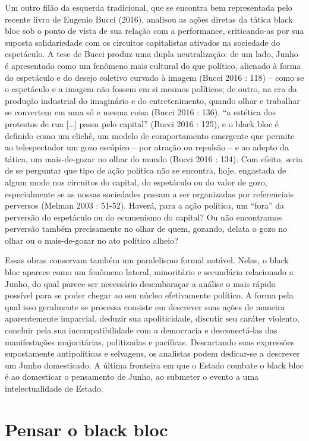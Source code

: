 Um outro filão da esquerda tradicional, que se encontra bem representada
pelo recente livro de Eugenio Bucci (2016), analisou as ações diretas da
tática black bloc sob o ponto de vista de sua relação com a performance,
criticando-as por sua suposta solidariedade com os circuitos
capitalistas ativados na sociedade do espetáculo. A tese de Bucci produz
uma dupla neutralização: de um lado, Junho é apresentado como um
fenômeno mais cultural do que político, alienado à forma do espetáculo e
do desejo coletivo curvado à imagem (Bucci 2016 : 118) -- como se o
espetáculo e a imagem não fossem em si mesmos políticos; de outro, na
era da produção industrial do imaginário e do entretenimento, quando
olhar e trabalhar se convertem em uma só e mesma coisa (Bucci 2016 :
136), ``a estética dos protestos de rua {[}\ldots{}{]} passa pelo
capital'' (Bucci 2016 : 125), e o black bloc é definido como um clichê,
um modelo de comportamento emergente que permite ao telespectador um
gozo escópico -- por atração ou repulsão -- e ao adepto da tática, um
mais-de-gozar no olhar do mundo (Bucci 2016 : 134). Com efeito, seria de
se perguntar que tipo de ação política não se encontra, hoje, engastada
de algum modo nos circuitos do capital, do espetáculo ou do valor de
gozo, especialmente se as nossas sociedades passam a ser organizadas por
referenciais perversos (Melman 2003 : 51-52). Haverá, para a ação
política, um ``fora'' da perversão do espetáculo ou do ecumenismo do
capital? Ou não encontramos perversão também precisamente no olhar de
quem, gozando, delata o gozo no olhar ou o mais-de-gozar no ato político
alheio?

Essas obras conservam também um paralelismo formal notável. Nelas, o
black bloc aparece como um fenômeno lateral, minoritário e secundário
relacionado a Junho, do qual parece ser necessário desembaraçar a
análise o mais rápido possível para se poder chegar ao seu núcleo
efetivamente político. A forma pela qual isso geralmente se processa
consiste em descrever suas ações de maneira aparentemente imparcial,
deduzir sua apoliticidade, discutir seu caráter violento, concluir pela
sua incompatibilidade com a democracia e desconectá-las das
manifestações majoritárias, politizadas e pacíficas. Descartando suas
expressões supostamente antipolíticas e selvagens, os analistas podem
dedicar-se a descrever um Junho domesticado. A última fronteira em que o
Estado combate o black bloc é ao domesticar o pensamento de Junho, ao
submeter o evento a uma intelectualidade de Estado.

\section{Pensar o black bloc}

